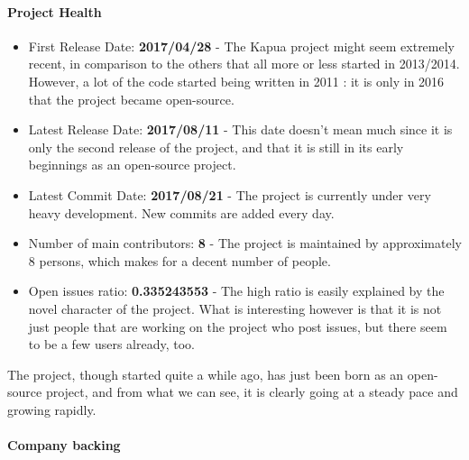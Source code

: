 \documentclass{article}
\begin{document}
\paragraph{Project Health}

\begin{itemize}
\item First Release Date: \textbf{2017/04/28} - The Kapua project might seem extremely recent, in comparison to the others that all more or less started in 2013/2014. However, a lot of the code started being written in 2011 : it is only in 2016 that the project became open-source.
\item Latest Release Date: \textbf{2017/08/11} - This date doesn't mean much since it is only the second release of the project, and that it is still in its early beginnings as an open-source project.
\item Latest Commit Date: \textbf{2017/08/21} - The project is currently under very heavy development. New commits are added every day.
\item Number of main contributors: \textbf{8} - The project is maintained by approximately 8 persons, which makes for a decent number of people.
\item Open issues ratio: \textbf{0.335243553} - The high ratio is easily explained by the novel character of the project. What is interesting however is that it is not just people that are working on the project who post issues, but there seem to be a few users already, too.
\end{itemize}

The project, though started quite a while ago, has just been born as an open-source project, and from what we can see, it is clearly going at a steady pace and growing rapidly.

\paragraph{Company backing}
\end{document}

